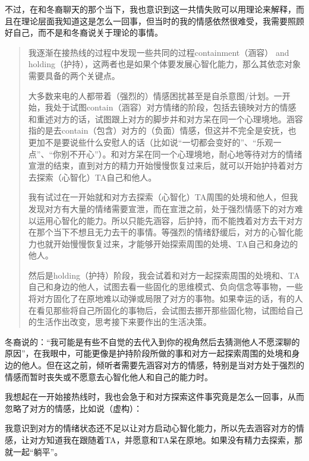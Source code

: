 不过，在和冬裔聊天的那个当下，我也意识到这一共情失败可以用理论来解释，而且在理论层面我知道这是怎么一回事，但当时的我的情感依然很难受，我需要照顾好自己，而不是和冬裔说关于理论的事情。

\blockquote{
我逐渐在接热线的过程中发现一些共同的过程\pozhehao{}containment（涵容） and holding（护持），这两者也是如果个体要发展心智化能力，那么其依恋对象需要具备的两个关键点。

大多数来电的人都带着（强烈的）情感困扰甚至是自杀意图/计划。一开始，我处于试图contain（涵容）对方情绪的阶段，包括去镜映对方的情感和重述对方的话，试图跟上对方的脚步并和对方呆在同一个心理境地。涵容指的是去contain（包含）对方的（负面）情感，但这并不完全是安抚，也更加不是要说些什么安慰人的话（比如说“一切都会变好的”、“乐观一点”、“你别不开心”）。和对方呆在同一个心理境地，耐心地等待对方的情绪宣泄的结束，直到对方的精力开始慢慢恢复过来后，就可以开始护持着对方去探索（心智化）TA自己和他人。

我有试过在一开始就和对方去探索（心智化）TA周围的处境和他人，但我发现对方有大量的情绪需要宣泄，而在宣泄之前，处于强烈情感下的对方难以运用心智化的能力。所以只能先涵容，后护持，而不能拽着对方去干对方在那个当下不想且无力去干的事情。等强烈的情绪舒缓后，对方的心智化能力也就开始慢慢恢复过来，才能够开始探索周围的处境、TA自己和身边的他人。

然后是holding（护持）阶段，我会试着和对方一起探索周围的处境和、TA自己和身边的他人，试图去看一些固化的思维模式、负向信念等事物，一些将对方固化了在原地难以动弹或局限了对方的事物。如果幸运的话，有的人在看见那些将自己所固化的事物后，会试图去挪开那些固化物，试图给自己的生活作出改变，思考接下来要作出的生活决策。

}

冬裔说的：“我可能是有些不自觉的去代入到你的视角然后去猜测他人不愿深聊的原因”，在我眼中，可能更像是护持阶段所做的事\pozhehao{}和对方一起探索周围的处境和身边的他人。但在这之前，倾听者需要先涵容对方的情感，特别是当对方处于强烈的情感而暂时丧失或不愿意去心智化他人和自己的能力时。

我想起在一开始接热线时，我也会急于和对方探索这件事究竟是怎么一回事，从而忽略了对方的情感，比如说（虚构）：


我意识到对方的情绪状态还不足以让对方启动心智化能力，所以先去涵容对方的情感，让对方知道我在跟随着TA，并愿意和TA呆在原地。如果没有精力去探索，那就一起“躺平”。

